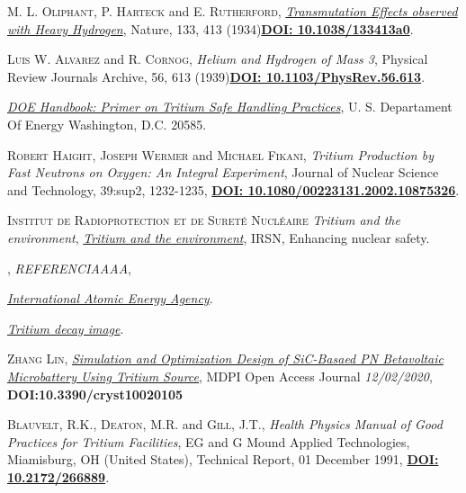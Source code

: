 \begin{thebibliography}{100}
 \textsc{M. L. Oliphant}, \textsc{P. Harteck} and \textsc{E. Rutherford},  
\href{https://royalsocietypublishing.org/doi/10.1098/rspa.1934.0077}{\textit{Transmutation Effects observed with Heavy Hydrogen}}, Nature, 133, 413 (1934)\href{https://doi.org/10.1038/133413a0}{\textbf{DOI: 10.1038/133413a0}}.

 \textsc{Luis W. Alvarez} and \textsc{R. Cornog},  
\textit{Helium and Hydrogen of Mass 3}, Physical Review Journals Archive, 56, 613 (1939)\href{https://doi.org/10.1103/PhysRev.56.613}{\textbf{DOI: 10.1103/PhysRev.56.613}}.

\href{https://www.twirpx.com/file/1977676/}{\textit{DOE Handbook: Primer on Tritium Safe Handling Practices}}, U. S. Departament Of Energy Washington, D.C. 20585.

 \textsc{Robert Haight}, \textsc{Joseph Wermer} and \textsc{Michael Fikani},
\textit{Tritium Production by Fast Neutrons on Oxygen: An Integral Experiment}, Journal of Nuclear Science and Technology, 39:sup2, 1232-1235, \href{https://doi.org/10.1080/00223131.2002.10875326}{\textbf{DOI: 10.1080/00223131.2002.10875326}}. 

 \textsc{Institut de Radioprotection et de Sureté Nucléaire}
\textit{Tritium and the environment}, \href{https://www.irsn.fr/EN/Research/publications-documentation/radionuclides-sheets/environment/Pages/Tritium-environment.aspx}{\textit{Tritium and the environment}}, IRSN, Enhancing nuclear safety. 

 \textsc{},
\textit{REFERENCIAAAA}, \textbf{}

\href{https://www-nds.iaea.org}{\textit{International Atomic Energy Agency}}.

\href{https://conexioncausal.wordpress.com}{\textit{Tritium decay image}}.

 \textsc{Zhang Lin},
\href{https://www.mdpi.com/2073-4352/10/2/105/htm}{\textit{Simulation and Optimization Design of SiC-Basaed PN Betavoltaic Microbattery Using Tritium Source}}, MDPI Open Access Journal \textit{12/02/2020}, \textbf{DOI:10.3390/cryst10020105}

 \textsc{Blauvelt, R.K.}, \textsc{Deaton, M.R.} and \textsc{Gill, J.T.},
\textit{Health Physics Manual of Good Practices for Tritium Facilities}, EG and G Mound Applied Technologies, Miamisburg, OH (United States), Technical Report,  01 December 1991, \href{https://doi.org/10.2172/266889}{\textbf{DOI: 10.2172/266889}}. 


\end{thebibliography}
